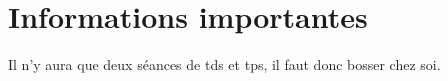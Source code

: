 \section{Informations importantes}
Il n'y aura que deux séances de tds et tps, il faut donc
bosser chez soi.
